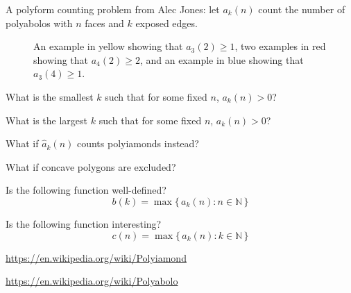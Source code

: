 \documentclass{article}
\begin{document}
A polyform counting problem from Alec Jones: let $a_k(n)$ count the number of polyabolos with $n$ faces
and $k$ exposed edges.
\begin{figure}[!h]
  \centering
  \hspace{1cm}
  \hspace{1cm}
  \caption{
    An example in yellow showing that $a_3(2) \geq 1$,
    two examples in red showing that $a_4(2) \geq 2$, and
    an example in blue showing that $a_3(4) \geq 1$.
  }
\end{figure}
\begin{question}
  What is the smallest $k$ such that for some fixed $n$, $a_k(n) > 0$?
\end{question}
\begin{related}
  \item What is the largest $k$ such that for some fixed $n$, $a_k(n) > 0$?
  \item What if $\hat{a}_k(n)$ counts polyiamonds instead?
  \item What if concave polygons are excluded?
  \item Is the following function well-defined? \[
    b(k) = \max \{\,a_k(n) : n \in \mathbb{N} \,\}
  \]
  \item Is the following function interesting? \[
    c(n) = \max \{\,a_k(n) : k \in \mathbb{N} \,\}
  \]
\end{related}
\begin{references}
  \item \url{https://en.wikipedia.org/wiki/Polyiamond}
  \item \url{https://en.wikipedia.org/wiki/Polyabolo}
\end{references}
\end{document}
